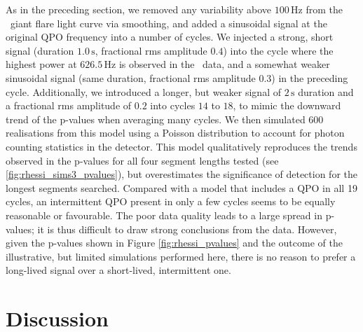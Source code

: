 \documentclass{emulateapj}
\begin{document}
As in the preceding section, we removed any variability above $100 \,\mathrm{Hz}$ from the \rhessi\ giant flare light curve via smoothing, and added a sinusoidal signal at the original QPO frequency into a number of cycles.
We injected a strong, short signal (duration $1.0 \,\mathrm{s}$, fractional rms amplitude $0.4$) into the cycle where the highest power at $626.5 \,\mathrm{Hz}$ is observed in the \rhessi\ data, and a somewhat weaker sinusoidal signal (same duration, fractional rms amplitude $0.3$) in the preceding cycle.
Additionally, we introduced a longer, but weaker signal of $2\,\mathrm{s}$ duration and a fractional rms amplitude of $0.2$ into cycles $14$ to $18$, to mimic the downward trend of the p-values when averaging many cycles. We then simulated $600$ realisations from this model using a Poisson distribution to account for photon counting statistics in the detector.
This model qualitatively reproduces the trends observed in the p-values for all four segment lengths tested (see \ref{fig:rhessi_sims3_pvalues}), but overestimates the significance of detection for the longest segments searched. Compared with a model that includes a QPO in all 19 cycles, an intermittent QPO present in only a few cycles seems to be equally reasonable or favourable. The poor data quality leads to a large spread in p-values; it is thus difficult to draw strong conclusions from the data. However, given the p-values shown in Figure \ref{fig:rhessi_pvalues} and the outcome of the illustrative, but limited simulations performed here, there is no reason to prefer a long-lived signal over a short-lived, intermittent one.


\section{Discussion}
\label{sec:discussion}
\end{document}

